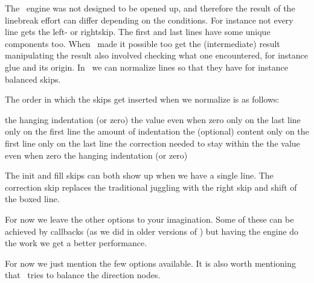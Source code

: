 \startnewprimitive[title={\prm {normalizelinemode}}]

The \TEX\ engine was not designed to be opened up, and therefore the result of
the linebreak effort can differ depending on the conditions. For instance not
every line gets the left- or rightskip. The first and last lines have some unique
components too. When \LUATEX\ made it possible too get the (intermediate) result
manipulating the result also involved checking what one encountered, for instance
glue and its origin. In \LUAMETATEX\ we can normalize lines so that they have for
instance balanced skips.

\starttworows
{}
\stoptworows

The order in which the skips get inserted when we normalize is as follows:

\starttabulate
\NC {}     \NC the hanging indentation (or zero) \NC \NR
\NC {}         \NC the value even when zero \NC \NR
\NC {}  \NC only on the last line \NC \NR
\NC {}  \NC only on the first line \NC \NR
\NC {}       \NC the amount of indentation \NC \NR
\NC \unknown                \NC the (optional) content \NC \NR
\NC {} \NC only on the first line \NC \NR
\NC {} \NC only on the last line \NC \NR
\NC {}   \NC the correction needed to stay within the  \NC \NR
\NC {}        \NC the value even when zero \NC \NR
\NC {}    \NC the hanging indentation (or zero) \NC \NR
\stoptabulate

The init and fill skips can both show up when we have a single line. The
correction skip replaces the traditional juggling with the right skip and shift
of the boxed line.

For now we leave the other options to your imagination. Some of these can be
achieved by callbacks (as we did in older versions of \CONTEXT) but having the
engine do the work we get a better performance.

\stopnewprimitive

\startnewprimitive[title={\prm {normalizeparmode}}]

For now we just mention the few options available. It is also worth mentioning that
\LUAMETATEX\ tries to balance the direction nodes.

\starttworows
{}
\stoptworows

\stopnewprimitive

